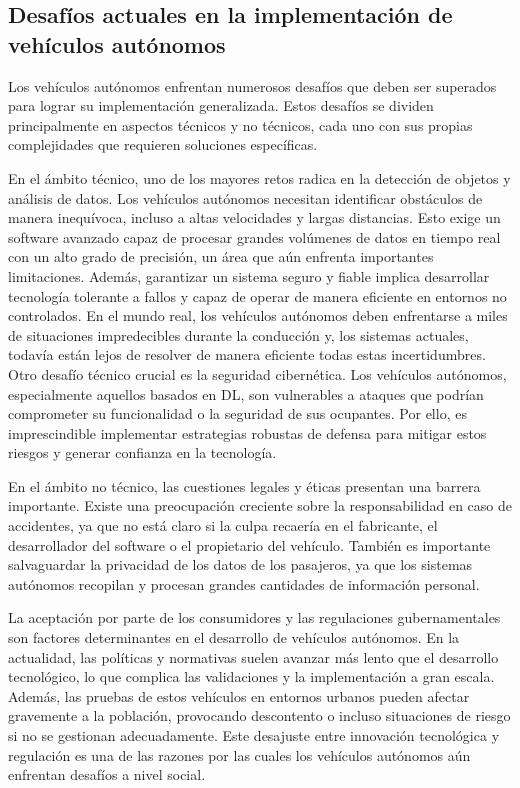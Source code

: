 \newpage

\subsection{Desafíos actuales en la implementación de vehículos autónomos}
\label{sec:desafíos}

Los vehículos autónomos enfrentan numerosos desafíos que deben ser superados para lograr su implementación generalizada. Estos desafíos se dividen principalmente en aspectos técnicos y no técnicos, cada uno con sus propias complejidades que requieren soluciones específicas.

En el ámbito técnico, uno de los mayores retos radica en la detección de objetos y análisis de datos. Los vehículos autónomos necesitan identificar obstáculos de manera inequívoca, incluso a altas velocidades y largas distancias. Esto exige un software avanzado capaz de procesar grandes volúmenes de datos en tiempo real con un alto grado de precisión, un área que aún enfrenta importantes limitaciones. Además, garantizar un sistema seguro y fiable implica desarrollar tecnología tolerante a fallos y capaz de operar de manera eficiente en entornos no controlados. En el mundo real, los vehículos autónomos deben enfrentarse a miles de situaciones impredecibles durante la conducción y, los sistemas actuales, todavía están lejos de resolver de manera eficiente todas estas incertidumbres. Otro desafío técnico crucial es la seguridad cibernética. Los vehículos autónomos, especialmente aquellos basados en \ac{DL}, son vulnerables a ataques que podrían comprometer su funcionalidad o la seguridad de sus ocupantes. Por ello, es imprescindible implementar estrategias robustas de defensa para mitigar estos riesgos y generar confianza en la tecnología.

En el ámbito no técnico, las cuestiones legales y éticas presentan una barrera importante. Existe una preocupación creciente sobre la responsabilidad en caso de accidentes, ya que no está claro si la culpa recaería en el fabricante, el desarrollador del software o el propietario del vehículo. También es importante salvaguardar la privacidad de los datos de los pasajeros, ya que los sistemas autónomos recopilan y procesan grandes cantidades de información personal.

La aceptación por parte de los consumidores y las regulaciones gubernamentales son factores determinantes en el desarrollo de vehículos autónomos. En la actualidad, las políticas y normativas suelen avanzar más lento que el desarrollo tecnológico, lo que complica las validaciones y la implementación a gran escala. Además, las pruebas de estos vehículos en entornos urbanos pueden afectar gravemente a la población, provocando descontento o incluso situaciones de riesgo si no se gestionan adecuadamente. Este desajuste entre innovación tecnológica y regulación es una de las razones por las cuales los vehículos autónomos aún enfrentan desafíos a nivel social.

